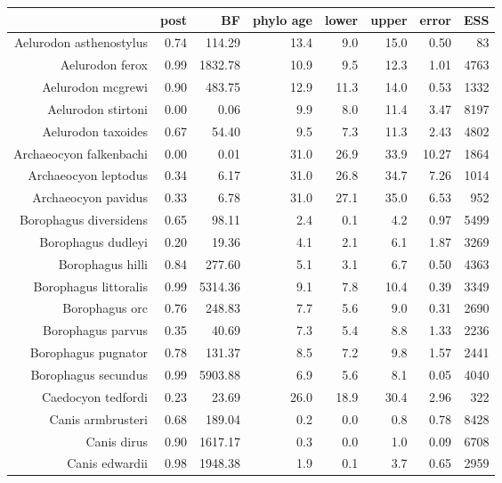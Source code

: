 \begin{table}[ht]
\centering
\begin{tabular}{rrrrrrrr}
  \hline
 & post & BF & phylo age & lower & upper & error & ESS \\ 
  \hline
Aelurodon asthenostylus & 0.74 & 114.29 & 13.4 & 9.0 & 15.0 & 0.50 & 83 \\ 
  Aelurodon ferox & 0.99 & 1832.78 & 10.9 & 9.5 & 12.3 & 1.01 & 4763 \\ 
  Aelurodon mcgrewi & 0.90 & 483.75 & 12.9 & 11.3 & 14.0 & 0.53 & 1332 \\ 
  Aelurodon stirtoni & 0.00 & 0.06 & 9.9 & 8.0 & 11.4 & 3.47 & 8197 \\ 
  Aelurodon taxoides & 0.67 & 54.40 & 9.5 & 7.3 & 11.3 & 2.43 & 4802 \\ 
  Archaeocyon falkenbachi & 0.00 & 0.01 & 31.0 & 26.9 & 33.9 & 10.27 & 1864 \\ 
  Archaeocyon leptodus & 0.34 & 6.17 & 31.0 & 26.8 & 34.7 & 7.26 & 1014 \\ 
  Archaeocyon pavidus & 0.33 & 6.78 & 31.0 & 27.1 & 35.0 & 6.53 & 952 \\ 
  Borophagus diversidens & 0.65 & 98.11 & 2.4 & 0.1 & 4.2 & 0.97 & 5499 \\ 
  Borophagus dudleyi & 0.20 & 19.36 & 4.1 & 2.1 & 6.1 & 1.87 & 3269 \\ 
  Borophagus hilli & 0.84 & 277.60 & 5.1 & 3.1 & 6.7 & 0.50 & 4363 \\ 
  Borophagus littoralis & 0.99 & 5314.36 & 9.1 & 7.8 & 10.4 & 0.39 & 3349 \\ 
  Borophagus orc & 0.76 & 248.83 & 7.7 & 5.6 & 9.0 & 0.31 & 2690 \\ 
  Borophagus parvus & 0.35 & 40.69 & 7.3 & 5.4 & 8.8 & 1.33 & 2236 \\ 
  Borophagus pugnator & 0.78 & 131.37 & 8.5 & 7.2 & 9.8 & 1.57 & 2441 \\ 
  Borophagus secundus & 0.99 & 5903.88 & 6.9 & 5.6 & 8.1 & 0.05 & 4040 \\ 
  Caedocyon tedfordi & 0.23 & 23.69 & 26.0 & 18.9 & 30.4 & 2.96 & 322 \\ 
  Canis armbrusteri & 0.68 & 189.04 & 0.2 & 0.0 & 0.8 & 0.78 & 8428 \\ 
  Canis dirus & 0.90 & 1617.17 & 0.3 & 0.0 & 1.0 & 0.09 & 6708 \\ 
  Canis edwardii & 0.98 & 1948.38 & 1.9 & 0.1 & 3.7 & 0.65 & 2959 \\ 

\end{tabular}
\end{table}
